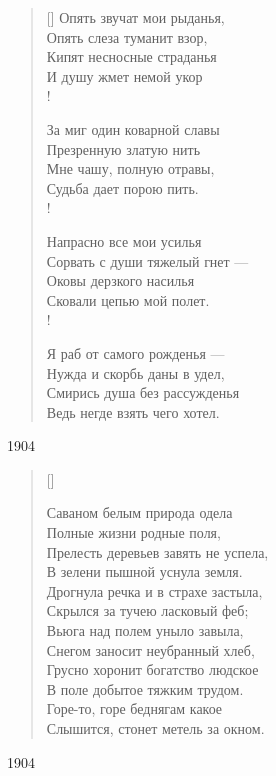 \settowidth{\versewidth}{Опять звучат мои рыданья}
\begin{verse}[\versewidth]
Опять звучат мои рыданья,\\
Опять слеза туманит взор,\\
Кипят несносные страданья\\
И душу жмет немой укор\\!

За миг один коварной славы\\
Презренную златую нить\\
Мне чашу, полную отравы,\\
Судьба дает порою пить.\\!

Напрасно все мои усилья\\
Сорвать с души тяжелый гнет ---\\
Оковы дерзкого насилья\\
Сковали цепью мой полет.\\!

Я раб от самого рожденья ---\\
Нужда и скорбь даны в удел,\\
Смирись душа без рассужденья\\
Ведь негде взять чего хотел.
\end{verse}
1904

\settowidth{\versewidth}{Дрогнула речка и в страхе застыла}
\begin{verse}[\versewidth]
\begin{altverse}
Саваном белым природа одела\\
Полные жизни родные поля,\\
Прелесть деревьев завять не успела,\\
В зелени пышной уснула земля.\\
Дрогнула речка и в страхе застыла,\\
Скрылся за тучею ласковый феб;\\
Вьюга над полем уныло завыла,\\
Снегом заносит неубранный хлеб,\\
Грусно хоронит богатство людское\\
В поле добытое тяжким трудом.\\
Горе-то, горе беднягам какое\\
Слышится, стонет метель за окном.
\end{altverse}
\end{verse}
1904


